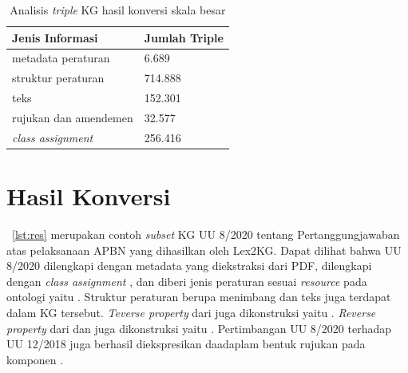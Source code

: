 \begin{table}
  \centering
  \begin{tabular}{|l|l|} \hline
    Jenis Informasi           & Jumlah Triple \\\hline \hline
    metadata peraturan        & 6.689         \\\hline
    struktur peraturan        & 714.888       \\\hline
    teks                      & 152.301       \\\hline
    rujukan dan amendemen     & 32.577        \\\hline
    \textit{class assignment} & 256.416       \\\hline
  \end{tabular}
  \caption{Analisis \textit{triple} KG hasil konversi skala besar}
  \label{tab:analisis-triple}
\end{table}

\section{Hasil Konversi}
\label{sec:hasil-konversi}

\lst~\ref{lst:res} merupakan contoh \textit{subset} KG UU 8/2020 tentang Pertanggungjawaban atas
pelaksanaan APBN yang dihasilkan oleh Lex2KG. Dapat dilihat bahwa UU 8/2020 dilengkapi dengan
metadata yang diekstraksi dari PDF, dilengkapi dengan \textit{class assignment} , dan diberi jenis peraturan sesuai \textit{resource} pada ontologi yaitu .
Struktur peraturan berupa menimbang dan teks juga terdapat dalam KG tersebut. \textit{Teverse
property} dari  juga dikonstruksi yaitu . \textit{Reverse property}
dari  dan  juga dikonstruksi yaitu . Pertimbangan UU
8/2020 terhadap UU 12/2018 juga berhasil diekspresikan daadaplam bentuk rujukan pada komponen
.


